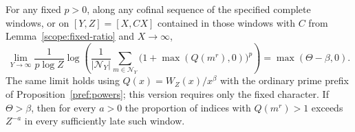 \begin{theorem}\label{scope:sparse-moment}
For any fixed \(p>0\), along any cofinal sequence of the specified
complete windows, or on \([Y,Z]=[X,CX]\) contained in those
windows with \(C\) from Lemma~\ref{scope:fixed-ratio} and \(X\to\infty\),
\[
 \lim_{Y\to\infty}
 \frac{1}{p\log Z}\log\!\left(
       \frac1{|\mathcal N_Y|}
       \sum_{m\in\mathcal N_Y}
                  \big(1+\max(Q(m^r),0)\big)^p\right)
       =\max(\Theta-\beta,0).
\]
The same limit holds using \(Q(x)=W_Z(x)/x^\beta\) with the ordinary
prime prefix of Proposition~\ref{pref:powers}; this version requires
only the fixed character. If \(\Theta>\beta\), then for every
\(a>0\) the proportion of indices with \(Q(m^r)>1\) exceeds
\(Z^{-a}\) in every sufficiently late such window.
\end{theorem}
